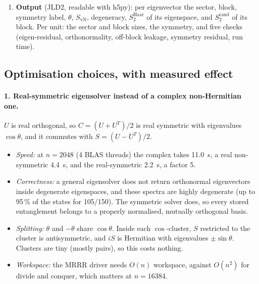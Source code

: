 \begin{enumerate}
\begin{enumerate}
  \item \emph{Per block}: real-symmetric eigensolve of $C=(A_b+A_b^T)/2$; clustering of $\cos\theta$; within each
    cluster, the Hermitian matrix $iV_c^TS_bV_c$, with $S_b=(A_b-A_b^T)/2$, separates $\theta$ from
    $-\theta$. Then quasienergy
    groups (degeneracies); symmetry labels by successive diagonalisation inside each degenerate eigenspace;
    entanglement.
  \end{enumerate}
\item \textbf{Output} (JLD2, readable with h5py): per eigenvector the sector, block, symmetry label, $\theta$,
  $S_\mathrm{vN}$, degeneracy, $S_2^\mathrm{Haar}$ of its eigenspace, and $S_2^\mathrm{rand}$ of its block. Per unit: the
  sector and block sizes, the symmetry, and five checks (eigen-residual, orthonormality, off-block leakage, symmetry
  residual, run time).
\end{enumerate}

\subsection{Optimisation choices, with measured effect}

\paragraph{1. Real-symmetric eigensolver instead of a complex non-Hermitian one.} $U$ is real orthogonal, so
$C=(U+U^T)/2$ is real symmetric with eigenvalues $\cos\theta$, and it commutes with $S=(U-U^T)/2$.
\begin{itemize}
\item \emph{Speed:} at $n=2048$ (4 BLAS threads) the complex  takes 11.0~s, a real non-symmetric
   4.4~s, and the real-symmetric  2.2~s, a factor 5.
\item \emph{Correctness:} a general eigensolver does not return orthonormal eigenvectors inside degenerate eigenspaces,
  and these spectra are highly degenerate (up to 95\,\% of the states for 105/150). The symmetric solver does, so every
  stored entanglement belongs to a properly normalised, mutually orthogonal basis.
\item \emph{Splitting:} $\theta$ and $-\theta$ share $\cos\theta$. Inside each $\cos$-cluster, $S$ restricted to the
  cluster is antisymmetric, and $iS$ is Hermitian with eigenvalues $\pm\sin\theta$. Clusters are tiny (mostly pairs),
  so this costs nothing.
\item \emph{Workspace:} the MRRR driver needs $O(n)$ workspace, against $O(n^2)$ for divide and conquer, which matters
  at $n=16384$.
\end{itemize}

